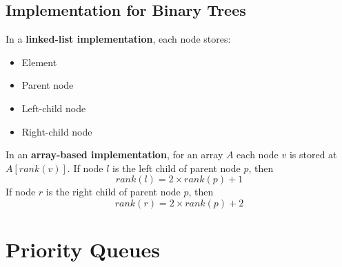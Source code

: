 \documentclass[12pt]{extarticle}
\newcommand{\N}{\newline\newline}
\begin{document}
	\subsection{Implementation for Binary Trees}
	In a \textbf{linked-list implementation}, each node stores:
	\begin{itemize}
		\item Element
		\item Parent node
		\item Left-child node
		\item Right-child node
	\end{itemize}
	In an \textbf{array-based implementation}, for an array $A$ each node $v$ is stored at $A[\textit{rank}(v)]$.\N
	If node $l$ is the left child of parent node $p$, then
	\begin{equation*}
		\textit{rank}(l) = 2\times\textit{rank}(p) + 1
	\end{equation*} 
	If node $r$ is the right child of parent node $p$, then
	\begin{equation*}
		\textit{rank}(r) = 2\times\textit{rank}(p) + 2
	\end{equation*}
	\newpage
	\section{Priority Queues}
\end{document}
